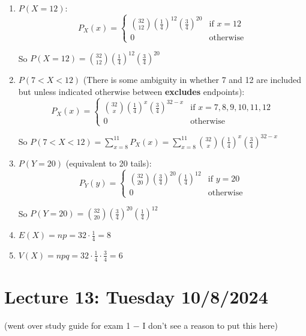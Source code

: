 \documentclass{article}
\begin{document}
    \begin{enumerate}
        \item $P(X = 12)$:
            \[P_X(x) = \begin{cases} 
                \binom{32}{12} \left(\frac{1}{4}\right)^{12} \left(\frac{3}{4}\right)^{20} & \text{if } x = 12 \\
                0 & \text{otherwise}
            \end{cases}\]

            So $P(X = 12) = \binom{32}{12} \left(\frac{1}{4}\right)^{12} \left(\frac{3}{4}\right)^{20}$
        \item $P(7 < X < 12)$ (There is some ambiguity in whether 7 and 12 are included but unless indicated otherwise between \textbf{excludes} endpoints):
            \[P_X(x) = \begin{cases} 
                \binom{32}{x} \left(\frac{1}{4}\right)^{x} \left(\frac{3}{4}\right)^{32-x} & \text{if } x = 7, 8, 9, 10, 11, 12 \\
                0 & \text{otherwise}
            \end{cases}\]

            So $P(7 < X < 12) = \sum_{x=8}^{11} P_X(x) = \sum_{x=8}^{11} \binom{32}{x} \left(\frac{1}{4}\right)^{x} \left(\frac{3}{4}\right)^{32-x}$

        \item $P(Y = 20)$ (equivalent to 20 tails):
            \[P_Y(y) = \begin{cases} 
                \binom{32}{20} \left(\frac{3}{4}\right)^{20} \left(\frac{1}{4}\right)^{12} & \text{if } y = 20 \\
                0 & \text{otherwise}
            \end{cases}\]

            So $P(Y = 20) = \binom{32}{20} \left(\frac{3}{4}\right)^{20} \left(\frac{1}{4}\right)^{12}$

        \item $E(X) = np = 32 \cdot \frac{1}{4} = 8$

        \item $V(X) = npq = 32 \cdot \frac{1}{4} \cdot \frac{3}{4} = 6$
    \end{enumerate}

    \section*{Lecture 13: Tuesday 10/8/2024}

    (went over study guide for exam 1 $-$ I don't see a reason to put this here)
\end{document}
